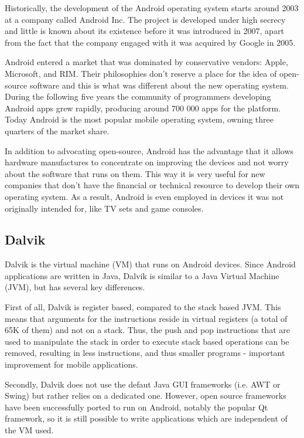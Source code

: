 \documentclass[parskip]{cs4rep}
\begin{document}
Historically, the development of the Android operating system starts around 2003 at a company called Android Inc\cite{BloombergBusinessweek2005}. The project is developed under high secrecy and little is known about its existence before it was introduced in 2007, apart from the fact that the company engaged with it was acquired by Google in 2005.

Android entered a market that was dominated by conservative vendors: Apple, Microsoft, and RIM. Their philosophies don't reserve a place for the idea of open-source software and this is what was different about the new operating system. During the following five years the community of programmers developing Android apps grew rapidly, producing around 700 000 apps for the platform\cite{Islam2012}. Today Android is the most popular mobile operating system, owning three quarters of the market share\cite{IDC2012}.

In addition to advocating open-source, Android has the advantage that it allows hardware manufactures to concentrate on improving the devices and not worry about the software that runs on them. This way it is very useful for new companies that don't have the financial or technical resource to develop their own operating system. As a result, Android is even employed in devices it was not originally intended for, like TV sets and game consoles\cite{Telecompaper2012}\cite{Etherington2013}.

\subsection{Dalvik}

Dalvik is the virtual machine (VM) that runs on Android devices. Since Android applications are written in Java, Dalvik is similar to a Java Virtual Machine (JVM), but has several key differences.

First of all, Dalvik is register based, compared to the stack based JVM. This means that arguments for the instructions reside in virtual registers (a total of 65K of them) and not on a stack. Thus, the push and pop instructions that are used to manipulate the stack in order to execute stack based operations can be removed, resulting in less instructions, and thus smaller programs - important improvement for mobile applications.

Secondly, Dalvik does not use the defaut Java GUI frameworks (i.e. AWT or Swing) but rather relies on a dedicated one. However, open source frameworks have been successfully ported to run on Android, notably the popular Qt framework, so it is still possible to write applications which are independent of the VM  used.
\end{document}
